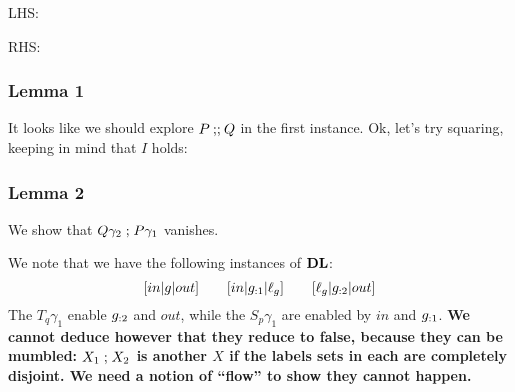 LHS:

RHS:

\subsubsection{Lemma 1}

It looks like we should explore $P \mathbin{;\!;} Q$ in the first instance.
Ok, let's try squaring, keeping in mind that $I$ holds:


\subsubsection{Lemma 2}

We show that $Q\gamma_2\mathrel{;} P\gamma_1$ vanishes.

We note that we have the following instances of $\mathbf{DL}$:
\[
  [in|g|out] \qquad [in|g_{:1}|\ell_g] \qquad [\ell_g|g_{:2}|out]
\]
The $T_q\gamma_1$ enable $g_{:2}$ and $out$,
while the $S_p\gamma_1$ are enabled by $in$ and $g_{:1}$.
\textbf{We cannot deduce however that they reduce to false,
because they can be mumbled: $X_1\mathrel{;} X_2$ is another $X$
if the labels sets in each are completely disjoint.
We need a notion of ``flow'' to show they cannot happen.}


